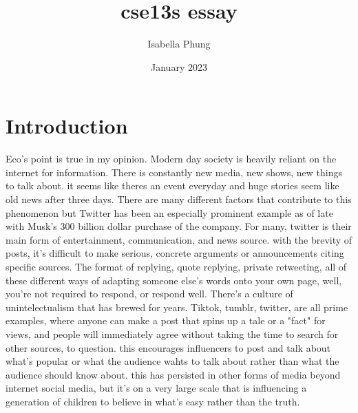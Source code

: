 \documentclass{article}
\title{cse13s essay}
\author{Isabella Phung}
\date{January 2023}
\begin{document}
\maketitle

\section{Introduction}
Eco's point is true in my opinion. Modern day society is heavily reliant on the internet for information. There is constantly new media, new shows, new things to talk about. it seems like theres an event everyday and huge stories seem like old news after three days. There are many different factors that contribute to this phenomenon but Twitter has been an especially prominent example as of late with Musk's 300 billion dollar purchase of the company. For many, twitter is their main form of entertainment, communication, and news source. with the brevity of posts, it's difficult to make serious, concrete arguments or announcements citing specific sources. The format of replying, quote replying, private retweeting, all of these different ways of adapting someone else's words onto your own page, well, you're not required to respond, or respond well. There's a culture of unintelectualism that has brewed for years. Tiktok, tumblr, twitter, are all prime examples, where anyone can make a post that spins up a tale or a "fact" for views, and people will immediately agree without taking the time to search for other sources, to question. this encourages influencers to post and talk about what's popular or what the audience wahts to talk about rather than what the audience should know about. this has persisted in other forms of media beyond internet social media, but it's on a very large scale that is influencing a generation of children to believe in what's easy rather than the truth.
\end{document}
